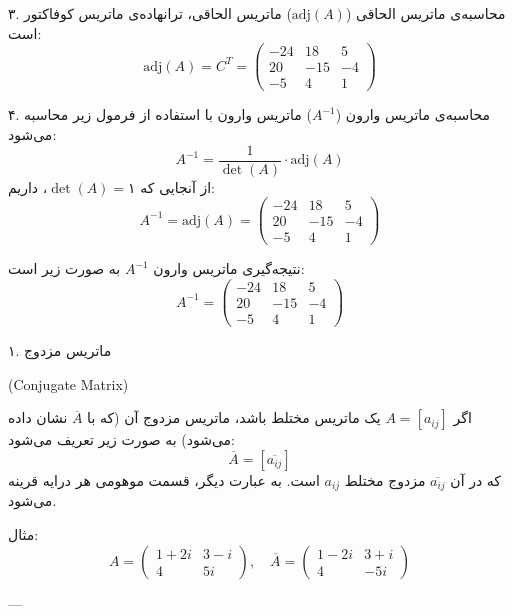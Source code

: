 \begin{scriptsize}
\begin{example}
	
	 ۳. محاسبه‌ی ماتریس الحاقی (\( \text{adj}(A) \))
	ماتریس الحاقی، ترانهاده‌ی ماتریس کوفاکتور است:
	\[
	\text{adj}(A) = C^T = \begin{pmatrix}
		-24 & 18 & 5 \\
		20 & -15 & -4 \\
		-5 & 4 & 1
	\end{pmatrix}
	\]
	

	
	 ۴. محاسبه‌ی ماتریس وارون (\( A^{-1} \))
	ماتریس وارون با استفاده از فرمول زیر محاسبه می‌شود:
	\[
	A^{-1} = \frac{1}{\det(A)} \cdot \text{adj}(A)
	\]
	از آنجایی که \( \det(A) = ۱ \)، داریم:
	\[
	A^{-1} = \text{adj}(A) = \begin{pmatrix}
		-24 & 18 & 5 \\
		20 & -15 & -4 \\
		-5 & 4 & 1
	\end{pmatrix}
	\]
	

	
	 نتیجه‌گیری
	ماتریس وارون \( A^{-1} \) به صورت زیر است:
	\[
	A^{-1} = \begin{pmatrix}
		-24 & 18 & 5 \\
		20 & -15 & -4 \\
		-5 & 4 & 1
	\end{pmatrix}
	\]
	
\end{example}	
	\end{scriptsize}
	
	
	\begin{definition}
		
	 ۱. ماتریس مزدوج
	 \begin{latin}
	 	 (Conjugate Matrix)
	 \end{latin}
	اگر \( A = [a_{ij}] \) یک ماتریس مختلط باشد، ماتریس مزدوج آن (که با \( \overline{A} \) نشان داده می‌شود) به صورت زیر تعریف می‌شود:
	\[
	\overline{A} = [\overline{a_{ij}}]
	\]
	که در آن \( \overline{a_{ij}} \) مزدوج مختلط \( a_{ij} \) است. به عبارت دیگر، قسمت موهومی هر درایه قرینه می‌شود.
	
	 مثال:
	\[
	A = \begin{pmatrix}
		1 + 2i & 3 - i \\
		4 & 5i
	\end{pmatrix}, \quad
	\overline{A} = \begin{pmatrix}
		1 - 2i & 3 + i \\
		4 & -5i
	\end{pmatrix}
	\]
	
	---
	\end{definition}
	
